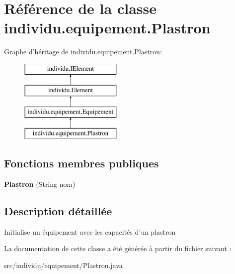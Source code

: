 \hypertarget{classindividu_1_1equipement_1_1_plastron}{\section{Référence de la classe individu.\-equipement.\-Plastron}
\label{classindividu_1_1equipement_1_1_plastron}
}
Graphe d'héritage de individu.\-equipement.\-Plastron\-:\begin{figure}[H]
\begin{center}
\leavevmode
\includegraphics[height=4.000000cm]{classindividu_1_1equipement_1_1_plastron}
\end{center}
\end{figure}
\subsection*{Fonctions membres publiques}
\begin{DoxyCompactItemize}
\item 
\hypertarget{classindividu_1_1equipement_1_1_plastron_ac95f0733dbb08cf0ad3af4dba28c90fe}{{\bfseries Plastron} (String nom)}\label{classindividu_1_1equipement_1_1_plastron_ac95f0733dbb08cf0ad3af4dba28c90fe}

\end{DoxyCompactItemize}


\subsection{Description détaillée}
Initialise un équipement avec les capacités d'un plastron 

La documentation de cette classe a été générée à partir du fichier suivant \-:\begin{DoxyCompactItemize}
\item 
src/individu/equipement/Plastron.\-java\end{DoxyCompactItemize}
